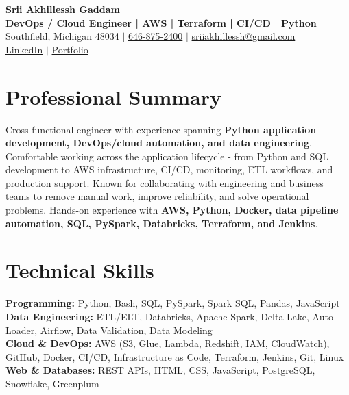 \documentclass[letterpaper,10pt]{article}
\begin{document}
\fontsize{9.35pt}{10.45pt}\selectfont

\begin{center}
    {\LARGE \textbf{Srii Akhillessh Gaddam}} \\[-1pt]
    \textbf{DevOps / Cloud Engineer | AWS | Terraform | CI/CD | Python} \\[2pt]
    Southfield, Michigan 48034 $|$
    \href{tel:6468752400}{646-875-2400} $|$
    \href{mailto:sriiakhillessh@gmail.com}{sriiakhillessh@gmail.com} \\[1pt]
    \href{https://www.linkedin.com/in/srii-akhiilessh-gaddam-b48668191/}{LinkedIn} $|$
    \href{https://sriiakhillesshg.github.io/portfolio/}{Portfolio}
\end{center}
\vspace{-8pt}

\section{Professional Summary}
\small{Cross-functional engineer with experience spanning \textbf{Python application development, DevOps/cloud automation, and data engineering}. Comfortable working across the application lifecycle - from Python and SQL development to AWS infrastructure, CI/CD, monitoring, ETL workflows, and production support. Known for collaborating with engineering and business teams to remove manual work, improve reliability, and solve operational problems. Hands-on experience with \textbf{AWS, Python, Docker, data pipeline automation, SQL, PySpark, Databricks, Terraform, and Jenkins}.}

\section{Technical Skills}
\small{
\textbf{Programming:} Python, Bash, SQL, PySpark, Spark SQL, Pandas, JavaScript \\
\textbf{Data Engineering:} ETL/ELT, Databricks, Apache Spark, Delta Lake, Auto Loader, Airflow, Data Validation, Data Modeling \\
\textbf{Cloud \& DevOps:} AWS (S3, Glue, Lambda, Redshift, IAM, CloudWatch), GitHub, Docker, CI/CD, Infrastructure as Code, Terraform, Jenkins, Git, Linux \\
\textbf{Web \& Databases:} REST APIs, HTML, CSS, JavaScript, PostgreSQL, Snowflake, Greenplum
}
\end{document}
